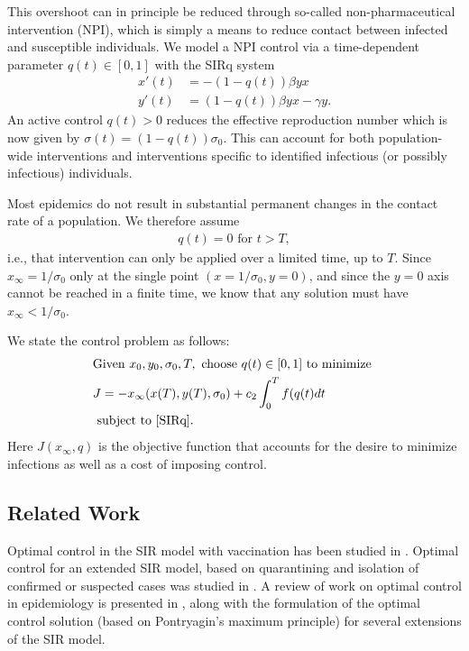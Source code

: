 \documentclass[english,12pt]{article}
\newcommand{\Rnot}{\sigma_0}
\begin{document}
This overshoot can in principle be reduced through so-called
non-pharmaceutical intervention (NPI), which is simply a means to
reduce contact between infected and susceptible individuals.  We model a NPI
control via a time-dependent parameter $q(t)\in[0,1]$ with the SIRq system
\begin{subequations} \label{SIRq}
\begin{align}
    x'(t) & = -(1-q(t))\beta y x \\
    y'(t) & = (1-q(t))\beta y x - \gamma y.
\end{align}
\end{subequations}
An active control $q(t)>0$ reduces the effective reproduction number which is now
given by $\sigma(t) = (1-q(t))\Rnot$.  This can account for both
population-wide interventions and interventions specific to identified infectious
(or possibly infectious) individuals.  

Most epidemics do not result in substantial permanent changes in the contact rate of
a population.  We therefore assume 
\begin{align} \label{q-shortterm}
    q(t)=0 \text{ for } t>T,
\end{align}
i.e., that intervention can only be applied over a limited time, up to $T$.
Since $x_\infty=1/\sigma_0$ only at the single point $(x=1/\sigma_0,y=0)$, and since 
the $y=0$ axis cannot be reached in a finite time, we know that any solution
must have $x_\infty<1/\sigma_0$.

We state the control problem as follows:
\begin{align} \label{eq:basic-problem}
\begin{aligned}
& \text{Given } x_0, y_0, \sigma_0, T, \text{ choose } q(t) \in [0,1] \text{ to minimize }  \\
&     J = -x_\infty(x(T),y(T),\sigma_0) + c_2 \int_0^T f(q(t) dt \\
& \text{ subject to } \eqref{SIRq}.
\end{aligned}
\end{align}
Here $J(x_\infty,q)$ is the objective function that accounts for the desire to
minimize infections as well as a cost of imposing control.


\subsection{Related Work}
Optimal control in the SIR model with vaccination has been studied in \cite{kar2011stability}.
Optimal control for an extended SIR model, based on quarantining and isolation
of confirmed or suspected cases was studied in \cite{yan2008optimal}.  
A review of work on optimal control in epidemiology is presented in \cite{sharomi2017optimal},
along with the formulation of the optimal control solution (based on
Pontryagin's maximum principle) for several extensions of the SIR model.
\end{document}
